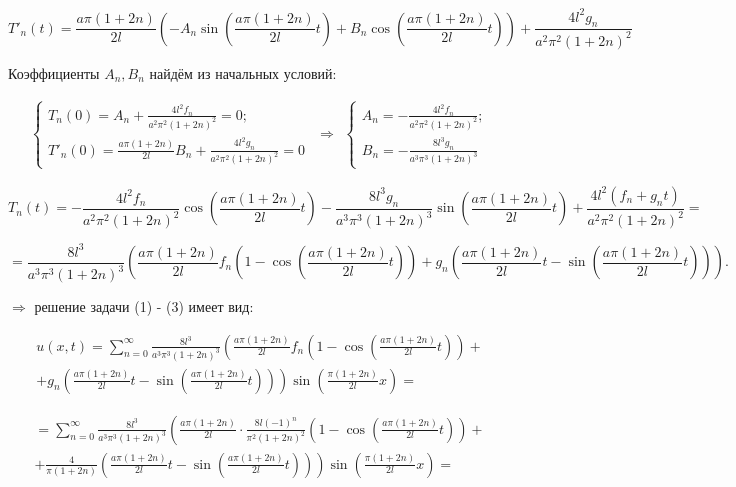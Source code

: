 $$T'_{n}(t) = \frac{a\pi(1 + 2n)}{2l} \left( -A_{n}\sin\left( \frac{a\pi(1 + 2n)}{2l}t \right) + B_{n} \cos \left( \frac{a\pi(1 + 2n)}{2l}t \right) \right) + \frac{4l^{2}g_{n}}{a^{2}\pi^{2}(1 + 2n)^{2}}$$

Коэффициенты $A_{n}, B_{n}$ найдём из начальных условий:

\begin{equation*}
  \begin{split}
    \begin{cases}
      T_{n}(0) = A_{n} + \frac{4l^{2}f_{n}}{a^{2}\pi^{2}(1 + 2n)^{2}} = 0;\\
      T'_{n}(0) = \frac{a\pi(1 + 2n)}{2l}B_{n} + \frac{4l^{2}g_{n}}{a^{2}\pi^{2}(1 + 2n)^{2}} = 0
    \end{cases}
  \end{split}
\Rightarrow
  \begin{split}
    \begin{cases}
      A_{n} = - \frac{4l^{2}f_{n}}{a^{2}\pi^{2}(1 + 2n)^{2}};\\
      B_{n} = - \frac{8l^{3}g_{n}}{a^{3}\pi^{3}(1 + 2n)^{3}}
    \end{cases}
  \end{split}
\end{equation*}

$$T_{n}(t) = - \frac{4l^{2}f_{n}}{a^{2}\pi^{2}(1 + 2n)^{2}} \cos \left( \frac{a\pi(1 + 2n)}{2l}t \right) - \frac{8l^{3}g_{n}}{a^{3}\pi^{3}(1 + 2n)^{3}} \sin \left( \frac{a\pi(1 + 2n)}{2l}t \right) + \frac{4l^{2}(f_{n} + g_{n}t)}{a^{2}\pi^{2}(1 + 2n)^{2}} =$$

$$ = \frac{8l^{3}}{a^{3}\pi^{3}(1 + 2n)^{3}} \left( \frac{a\pi(1 + 2n)}{2l}f_{n} \left( 1 - \cos \left( \frac{a\pi(1 + 2n)}{2l}t \right) \right) + g_{n} \left( \frac{a\pi(1 + 2n)}{2l}t - \sin \left( \frac{a\pi(1 + 2n)}{2l}t \right) \right) \right).$$

$\Rightarrow$ решение задачи (1) - (3) имеет вид:

\begin{multline*}
u(x, t) = \sum_{n=0}^{\infty} \frac{8l^{3}}{a^{3}\pi^{3}(1 + 2n)^{3}} \left( \frac{a\pi(1 + 2n)}{2l}f_{n} \left( 1 - \cos \left( \frac{a\pi(1 + 2n)}{2l}t \right) \right) + \right.\\
\left. + g_{n} \left( \frac{a\pi(1 + 2n)}{2l}t - \sin \left( \frac{a\pi(1 + 2n)}{2l}t \right) \right) \right) \sin \left( \frac{\pi(1 + 2n)}{2l}x \right) =
\end{multline*}

\begin{multline*}
= \sum_{n=0}^{\infty} \frac{8l^{3}}{a^{3}\pi^{3}(1 + 2n)^{3}} \left( \frac{a\pi(1 + 2n)}{2l} \cdot \frac{8l(-1)^{n}}{\pi^{2}(1 + 2n)^{2}} \left( 1 - \cos \left( \frac{a\pi(1 + 2n)}{2l}t \right) \right) + \right. \\
\left. + \frac{4}{\pi(1 + 2n)} \left( \frac{a\pi(1 + 2n)}{2l}t - \sin \left( \frac{a\pi(1 + 2n)}{2l}t \right) \right) \right) \sin \left( \frac{\pi(1 + 2n)}{2l}x \right) =
\end{multline*}

